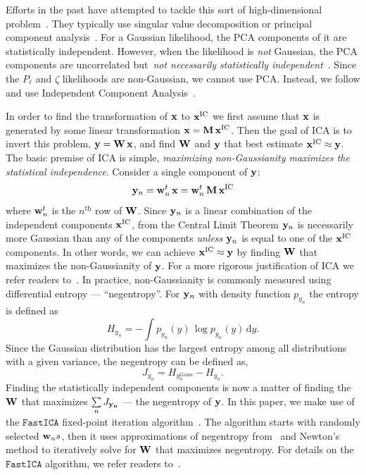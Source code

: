 \documentclass[12pt, letterpaper, preprint]{aastex}
\newcommand{\beq}{\begin{equation}}
\newcommand{\eeq}{\end{equation}}
\begin{document}
Efforts in the past have attempted to tackle this sort of 
high-dimensional problem~\citep[\emph{e.g.}][]{scoccimarro2000,eisenstein2001,gaztanaga2005,norberg2009,sinha2017}.
They typically use singular value decomposition or principal 
component analysis~\citep[PCA;][]{Press:1992:NRC:148286}. For a Gaussian
likelihood, the PCA components of it are statistically independent. 
However, when the likelihood is \emph{not} Gaussian, the PCA components 
are uncorrelated but~\emph{not necessarily statistically independent}~\citep{hartlap2009}. 
Since the $P_\ell$ and $\zeta$ likelihoods are non-Gaussian, we cannot 
use PCA. Instead, we follow \cite{hartlap2009} and use Independent 
Component Analysis~\citep[ICA][]{herault1984,comon1994,hyvarinen2000,
hyvarinen2001independent}. 

In order to find the transformation of ${\bf x}$ to ${\bf x}^\mathrm{IC}$ 
we first assume that ${\bf x}$ is generated by some linear transformation
${\bf x} = {\bf M}\,{\bf x}^\mathrm{IC}$. Then the goal of ICA is to invert 
this problem, ${\bf y} = {\bf W}\,{\bf x}$, and find ${\bf W}$ and ${\bf y}$ 
that best estimate ${\bf x}^\mathrm{IC} \approx {\bf y}$. The basic 
premise of ICA is simple, \emph{maximizing non-Gaussianity maximizes the 
statistical independence}. Consider a single component of ${\bf y}$: 
\beq
{\bf y}_n = {\bf w}_n^{\tiny t}\,{\bf x} = {\bf w}_n^{\tiny t}\,{\bf M}\,{\bf x}^\mathrm{IC} 
\eeq
where ${\bf w}_n^{\tiny t}$ is the $n^\mathrm{th}$ row of ${\bf W}$. 
Since ${\bf y}_n$ is a linear combination of the independent 
components ${\bf x}^\mathrm{IC}$, from the Central Limit Theorem 
${\bf y}_n$ is necessarily more Gaussian than any of the 
components \emph{unless} ${\bf y}_n$ is equal to one of the 
${\bf x}^\mathrm{IC}$ components. In other words, we can achieve 
${\bf x}^\mathrm{IC} \approx {\bf y}$ by finding ${\bf W}$ that 
maximizes the non-Gaussianity of ${\bf y}$. For a more rigorous 
justification of ICA we refer readers to~\cite{hyvarinen2001independent}. 
In practice, non-Gaussianity is commonly measured using differential
entropy --- ``negentropy''. For ${\bf y}_n$ with density function 
$p_{y_n}$ the entropy is defined as
\beq
H_{y_n} =  - \int p_{y_n} (y)\, \log p_{y_n}(y)\, \mathrm{d}y. 
\eeq
Since the Gaussian distribution has the largest entropy among all 
distributions with a given variance, the negentropy can be defined 
as, 
\beq
J_{y_n} = H_{y_n^\mathrm{Gauss}} - H_{y_n}. 
\eeq
Finding the statistically independent components is now a matter
of finding the ${\bf W}$ that maximizes $\sum\limits_{n} J_{\bf y_n}$
--- the negentropy of ${\bf y}$. In this paper, we make use of the 
$\mathtt{FastICA}$ fixed-point iteration algorithm~\citep{hyvarinen1999}. 
The algorithm starts with randomly selected ${\bf w}_ns$, then it uses 
approximations of negentropy from~\cite{hyvarinen1998} and Newton's method 
to iteratively solve for ${\bf W}$ that maximizes negentropy. For details 
on the $\mathtt{FastICA}$ algorithm, we refer readers to~\cite{hyvarinen1999}.
\end{document}
